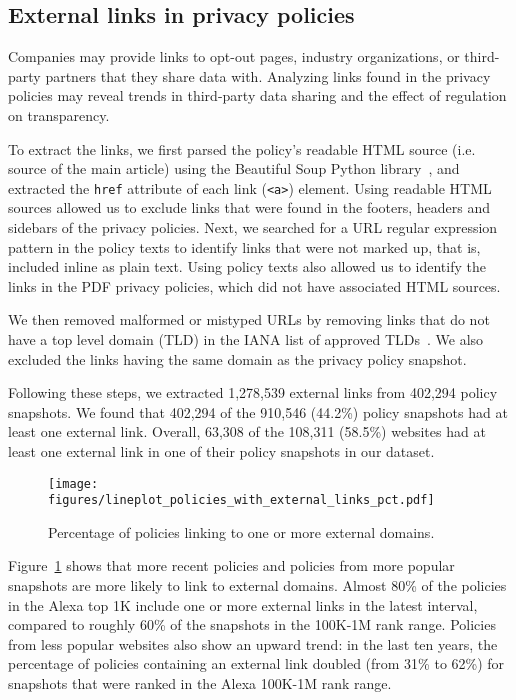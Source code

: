 \subsection{External links in privacy policies}
\label{sec:policy-links}


Companies may provide links to opt-out pages, industry organizations, or third-party partners that they share data with. Analyzing links found in the privacy policies may reveal trends in third-party data sharing and the effect of regulation on transparency.

To extract the links, we first parsed the policy's readable HTML source (i.e. source of the main article) using the Beautiful Soup Python library~\cite{beautifulsoup4}, and extracted the \texttt{href} attribute of each link (\texttt{<a>}) element. 
Using readable HTML sources allowed us to exclude links that were found in the footers, headers and sidebars of the privacy policies.
Next, we searched for a URL regular expression pattern in the policy texts to identify links that were not marked up, that is, included inline as plain text.
Using policy texts also allowed us to identify the links in the PDF privacy policies, which did not have associated HTML sources.

We then removed malformed or mistyped URLs by removing links that do not have a top level domain (TLD) in the IANA list of approved TLDs~\cite{iana-tld}. We also excluded the links having the same domain as the privacy policy snapshot.

Following these steps, we extracted 1,278,539 external links from 402,294 policy snapshots.
We found that 402,294 of the 910,546 (44.2\%) policy snapshots had at least one external link.
Overall, 63,308 of the 108,311 (58.5\%) websites had at least one external link in one of their policy snapshots in our dataset.


\begin{figure}[h]
\centering
\texttt{[image: figures/lineplot\_policies\_with\_external\_links\_pct.pdf]}
\caption{Percentage of policies linking to one or more external domains.}
\label{fig:pct-policies-with-links}
\end{figure}


Figure~\ref{fig:pct-policies-with-links} shows that more recent policies and policies from more popular snapshots are more likely to link to external domains. Almost 80\% of the policies in the Alexa top 1K include one or more external links in the latest interval, compared to roughly 60\% of the snapshots in the 100K-1M rank range. 
Policies from less popular websites also show an upward trend: in the last ten years, the percentage of policies containing an external link doubled (from 31\% to 62\%) for snapshots that were ranked in the Alexa 100K-1M rank range.

